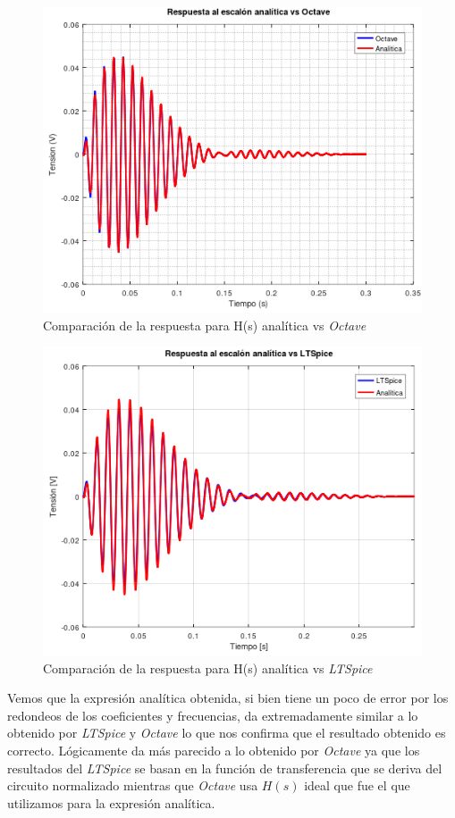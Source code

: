 \documentclass[11pt,a4paper]{report}
\begin{document}
\begin{figure}[h!]
\centering
\includegraphics[scale=1]{rtaEscalonAnaliticaVSOctave.png}
\caption{Comparación de la respuesta para H(s) analítica vs \textit{Octave}}
\end{figure}
\clearpage

\begin{figure}[ht!]
\centering
\includegraphics[scale=1]{rtaEscalonAnaliticaVSLTSpice.png}
\caption{Comparación de la respuesta para H(s) analítica vs \textit{LTSpice}}
\end{figure}

Vemos que la expresión analítica obtenida, si bien tiene un poco de error por los redondeos de los coeficientes y frecuencias, da extremadamente similar a lo obtenido por \textit{LTSpice} y \textit{Octave} lo que nos confirma que el resultado obtenido es correcto. Lógicamente da más parecido a lo obtenido por \textit{Octave} ya que los resultados del \textit{LTSpice} se basan en la función de transferencia que se deriva del circuito normalizado mientras que \textit{Octave} usa $H(s)$ ideal que fue el que utilizamos para la expresión analítica.
\end{document}
